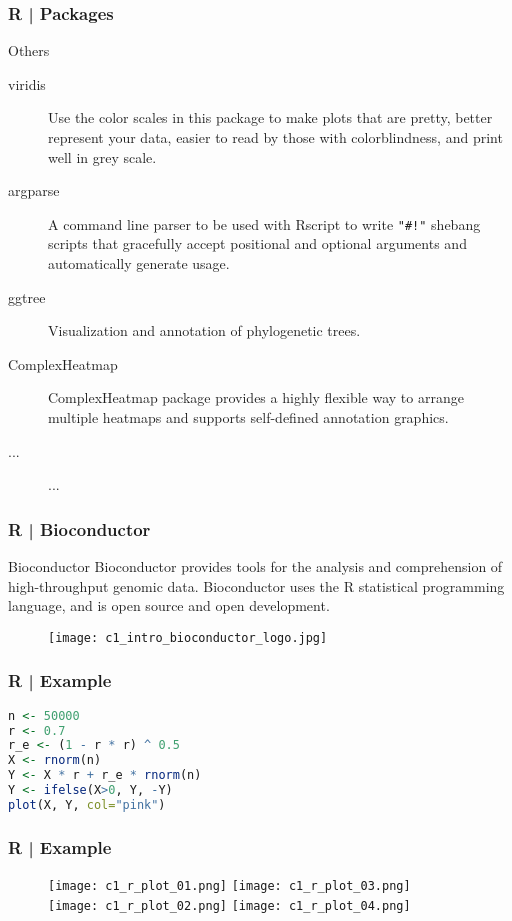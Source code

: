 \begin{frame}[fragile]
  \frametitle{R | Packages}
  \begin{block}{Others}
    \begin{description}
      \item[viridis] Use the color scales in this package to make plots that are pretty, better represent your data, easier to read by those with colorblindness, and print well in grey scale. 
      \item[\alert{argparse}] A command line parser to be used with Rscript to write \verb|"#!"| shebang scripts that gracefully accept positional and optional \alert{arguments} and automatically generate usage.
      \item[\alert{ggtree}] Visualization and annotation of \alert{phylogenetic trees}.
      \item[\alert{ComplexHeatmap}] ComplexHeatmap package provides a highly flexible way to arrange multiple \alert{heatmaps} and supports self-defined annotation graphics. 
      \item[...] ...
    \end{description}
  \end{block}
\end{frame}

\begin{frame}
  \frametitle{R | \alert{Bioconductor}}
  \begin{block}{Bioconductor}
    Bioconductor provides tools for the analysis and comprehension of high-throughput genomic data. Bioconductor uses the R statistical programming language, and is open source and open development.
  \end{block}
  \begin{figure}
    \centering
    \texttt{[image: c1\_intro\_bioconductor\_logo.jpg]}
  \end{figure}
\end{frame}

\begin{frame}[fragile]
  \frametitle{R | Example}
\begin{lstlisting}[language=R]
n <- 50000
r <- 0.7
r_e <- (1 - r * r) ^ 0.5
X <- rnorm(n)
Y <- X * r + r_e * rnorm(n)
Y <- ifelse(X>0, Y, -Y)
plot(X, Y, col="pink")
\end{lstlisting}
\end{frame}

\begin{frame}
  \frametitle{R | Example}
  \begin{figure}
    \centering
    \texttt{[image: c1\_r\_plot\_01.png]}\qquad
    \texttt{[image: c1\_r\_plot\_03.png]}\\
    \texttt{[image: c1\_r\_plot\_02.png]}
    \hspace{4em}
    \texttt{[image: c1\_r\_plot\_04.png]}
  \end{figure}
\end{frame}

